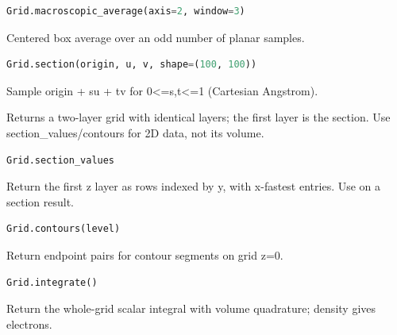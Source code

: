 \begin{samepage}

\begin{lstlisting}[language=Python]
Grid.macroscopic_average(axis=2, window=3)
\end{lstlisting}

Centered box average over an odd number of planar samples.

\end{samepage}



\begin{samepage}

\begin{lstlisting}[language=Python]
Grid.section(origin, u, v, shape=(100, 100))
\end{lstlisting}

Sample origin + su + tv for 0<=s,t<=1 (Cartesian Angstrom).

Returns a two-layer grid with identical layers; the first layer is
the section. Use section\_\allowbreak{}values/\allowbreak{}contours for 2D data, not its volume.

\end{samepage}



\begin{samepage}

\begin{lstlisting}[language=Python]
Grid.section_values
\end{lstlisting}

Return the first z layer as rows indexed by y, with x-fastest entries. Use on a section result.

\end{samepage}



\begin{samepage}

\begin{lstlisting}[language=Python]
Grid.contours(level)
\end{lstlisting}

Return endpoint pairs for contour segments on grid z=0.

\end{samepage}



\begin{samepage}

\begin{lstlisting}[language=Python]
Grid.integrate()
\end{lstlisting}

Return the whole-grid scalar integral with volume quadrature; density gives electrons.

\end{samepage}



